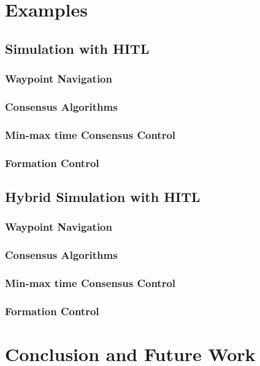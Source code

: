\documentclass[letterpaper, 10 pt, conference]{ieeeconf}
\begin{document}
\section{Examples}\label{sec: Use Cases}



\subsection{Simulation with HITL}

\subsubsection{Waypoint Navigation}
\subsubsection{Consensus Algorithms}
\subsubsection{Min-max time Consensus Control}
\subsubsection{Formation Control}

\subsection{Hybrid Simulation with HITL}

\subsubsection{Waypoint Navigation}
\subsubsection{Consensus Algorithms}
\subsubsection{Min-max time Consensus Control}
\subsubsection{Formation Control}


\section{Conclusion and Future Work} \label{sec:conc}






\end{document}
